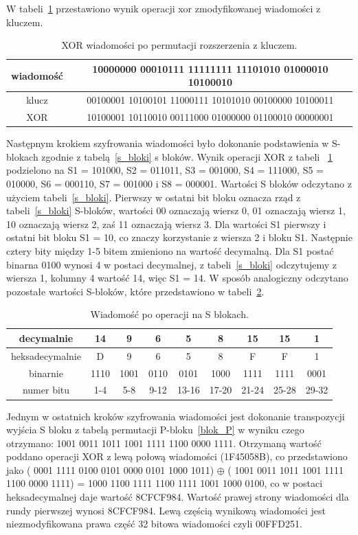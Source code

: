\documentclass[12p]{article}
\begin{document}
W tabeli~\ref{xor} przestawiono wynik operacji xor zmodyfikowanej wiadomości z kluczem.

\begin{table}[H]
\centering
\begin{tabular}{|c|c|}
\hline
wiadomość & 10000000 00010111 11111111 11101010 01000010 10100010\\ \hline
klucz & 00100001 10100101 11000111 10101010 00100000 10100011\\ \hline
XOR & 10100001 10110010 00111000 01000000 01100010 00000001\\ 
\hline
\end{tabular}
\caption{XOR wiadomości po permutacji rozszerzenia z kluczem.}\label{xor}
\end{table}

Następnym krokiem szyfrowania wiadomości było dokonanie podstawienia w S-blokach zgodnie z tabelą~\ref{s_bloki} s bloków. Wynik operacji XOR z tabeli ~\ref{xor} podzielono na S1 = 101000, S2 = 011011, S3 = 001000, S4 = 111000, S5 = 010000, S6 = 000110, S7 = 001000 i S8 = 000001. Wartości S bloków odczytano z użyciem tabeli~\ref{s_bloki}. Pierwszy w ostatni bit bloku oznacza rząd z tabeli~\ref{s_bloki} S-bloków, wartości 00 oznaczają wiersz 0, 01 oznaczają wiersz 1, 10 oznaczają wiersz 2, zaś 11 oznaczają wiersz 3. Dla wartości S1 pierwszy i ostatni bit bloku S1 = 10, co znaczy korzystanie z wiersza 2 i bloku S1. Następnie cztery bity między 1-5 bitem zmieniono na wartość decymalną. Dla S1 postać binarna 0100 wynosi 4 w postaci decymalnej, z tabeli~\ref{s_bloki} odczytujemy z wiersza 1, kolumny 4 wartość 14, więc S1 = 14. W sposób analogiczny odczytano pozostałe wartości S-bloków, które przedstawiono w tabeli~\ref{sbok_wynik}.
 
\begin{table}[H]
\centering
\begin{tabular}{|c|c|c|c|c|c|c|c|c|} 
\hline
decymalnie &14 &9& 6& 5& 8& 15& 15& 1\\ \hline
heksadecymalnie&D&9&6&5&8&F&F&1\\ \hline
binarnie & 1110& 1001& 0110& 0101& 1000& 1111& 1111& 0001\\ \hline
numer bitu &1-4 &5-8& 9-12& 13-16& 17-20& 21-24& 25-28& 29-32\\ \hline
\end{tabular}
\caption{Wiadomość po operacji na S blokach.}\label{sbok_wynik}
\end{table}

Jednym w ostatnich kroków szyfrowania wiadomości jest dokonanie transpozycji wyjścia S bloku z tabelą permutacji P-bloku~\ref{blok_P} w wyniku czego otrzymano: 1001 0011 1011 1001 1111 1100 0000 1111. Otrzymaną wartość poddano operacji XOR z lewą połową wiadomości (1F45058B), co przedstawiono jako (
0001 1111 0100 0101 0000 0101 1000 1011) $\oplus$ (
1001 0011 1011 1001 1111 1100 0000 1111) = 
1000 1100 1111 1100 1111 1001 1000 0100, co w postaci heksadecymalnej daje wartość 8CFCF984. Wartość prawej strony wiadomości dla rundy pierwszej wynosi 8CFCF984. Lewą częścią wynikową wiadomości jest niezmodyfikowana prawa część 32 bitowa wiadomości czyli 00FFD251.
\end{document}
